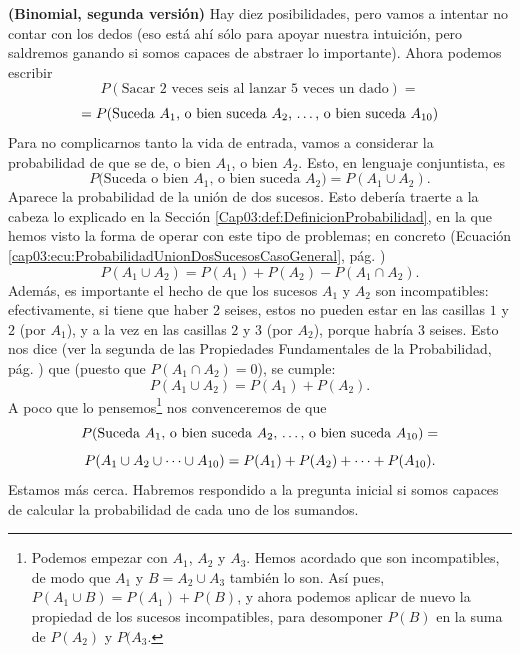 \begin{Ejemplo}{\bf (Binomial, segunda versión)}
         Hay diez posibilidades, pero vamos a intentar no contar con los dedos (eso est\'a ah\'i s\'olo para apoyar nuestra intuici\'on, pero saldremos ganando si somos capaces de abstraer lo importante). Ahora podemos escribir
          	\[P(\text{Sacar $2$ veces seis al lanzar $5$ veces un dado})=\]
          	\[=P(\text{Suceda $A_1$, o bien suceda $A_2$, \dots, o bien suceda $A_{10}$})
          	\]
         Para no complicarnos tanto la vida de entrada, vamos a considerar la probabilidad de que se de, o bien $A_1$, o bien $A_2$. Esto, en lenguaje conjuntista, es
         \[P(\text{Suceda o bien $A_1$, o bien suceda $A_2$)}=P(A_1\cup A_2).\]
         Aparece la probabilidad de la uni\'on de dos sucesos. Esto debería traerte a la cabeza
         lo explicado en la Secci\'on \ref{Cap03:def:DefinicionProbabilidad}, en la que hemos visto         la forma de operar con este tipo de problemas; en concreto (Ecuación \ref{cap03:ecu:ProbabilidadUnionDosSucesosCasoGeneral}, pág. \pageref{cap03:ecu:ProbabilidadUnionDosSucesosCasoGeneral})
		\[P(A_1\cup A_2)=P(A_1)+P(A_2)-P(A_1\cap A_2).\]
    Además, es importante el hecho de que los sucesos $A_1$ y $A_2$ son incompatibles: efectivamente, si tiene que haber 2 seises, estos no pueden estar en las casillas $1$ y $2$ (por $A_1$), y a la vez en las casillas $2$ y $3$ (por $A_2$), porque habría 3 seises. Esto nos dice (ver la segunda de las Propiedades Fundamentales de la Probabilidad, pág. \pageref{cap03:def:PropiedadesFundamentalesFuncionProbabilidad}) que (puesto que $P(A_1\cap A_2)=0$), se cumple:
         \[P(A_1\cup A_2)=P(A_1)+P(A_2).\]
         A poco que lo pensemos\footnote{Podemos empezar con $A_1$, $A_2$ y $A_3$.
         Hemos acordado que son incompatibles, de modo que $A_1$ y $B=A_2\cup A_3$ tambi\'en lo son.
         As\'i pues, $P(A_1\cup B)= P(A_1)+P( B)$, y ahora podemos aplicar de nuevo la propiedad de los sucesos incompatibles, para desomponer $P(B)$ en la suma de $P(A_2)$ y $P(A_3$.} nos convenceremos de que
         \[P(\text{Suceda $A_1$, o bien suceda $A_2$, \dots, o bien suceda
         $A_{10}$})=\]
	\[P(A_1\cup A_2 \cup \cdots \cup A_{10}) =P(A_1)+P(A_2)+\cdots+P(A_{10}).\\
                   	\]
          Estamos más cerca. Habremos respondido a la pregunta inicial si somos capaces de calcular la probabilidad de cada uno de los sumandos.


\end{Ejemplo}

